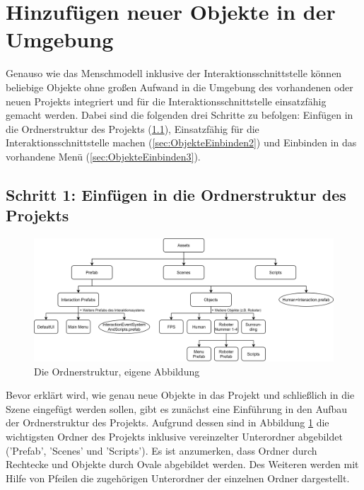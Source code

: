 \section{Hinzufügen neuer Objekte in der Umgebung}\label{sec:ObjekteEinbinden}
Genauso wie das Menschmodell inklusive der Interaktionsschnittstelle können beliebige Objekte ohne großen Aufwand in die Umgebung des vorhandenen oder neuen Projekts integriert und für die Interaktionsschnittstelle einsatzfähig gemacht werden. Dabei sind die folgenden drei Schritte zu befolgen: Einfügen in die Ordnerstruktur des Projekts (\ref{sec:ObjekteEinbinden1}), Einsatzfähig für die Interaktionsschnittstelle machen (\ref{sec:ObjekteEinbinden2}) und Einbinden in das vorhandene Menü (\ref{sec:ObjekteEinbinden3}).

\subsection{Schritt 1: Einfügen in die Ordnerstruktur des Projekts}\label{sec:ObjekteEinbinden1}
\begin{figure}[h]
	\centering
	\includegraphics[width=1\linewidth]{Bilder/A54_Ordnerstruktur}
	\caption{Die Ordnerstruktur, eigene Abbildung}
	\label{fig:Ordnerstruktur}
\end{figure}
\noindent Bevor erklärt wird, wie genau neue Objekte in das Projekt und schließlich in die Szene eingefügt werden sollen, gibt es zunächst eine Einführung in den Aufbau der Ordnerstruktur des Projekts. Aufgrund dessen sind in Abbildung \ref{fig:Ordnerstruktur} die wichtigsten Ordner des Projekts inklusive vereinzelter Unterordner abgebildet ('Prefab', 'Scenes' und 'Scripts'). Es ist anzumerken, dass Ordner durch Rechtecke und Objekte durch Ovale abgebildet werden. Des Weiteren werden mit Hilfe von Pfeilen die zugehörigen Unterordner der einzelnen Ordner dargestellt.
\newline

